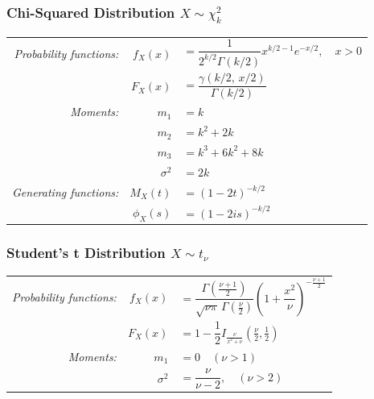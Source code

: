\documentclass[11pt,a4paper]{article}
\theoremstyle{definition}
\begin{document}
\subsubsection*{Chi-Squared Distribution $X \sim \chi^2_k$}
\begin{longtable}{r r l}
\textit{Probability functions:} & $f_X(x)$ & $=\dfrac{1}{2^{k/2}\Gamma(k/2)}x^{k/2-1}e^{-x/2}, \quad x>0$ \vspace{0.3cm}\\
& $F_X(x)$ & $=\dfrac{\gamma(k/2,\,x/2)}{\Gamma(k/2)}$ \\
\textit{Moments:} & $m_1$ & $=k$\\
& $m_2$ & $=k^2+2k$\\
& $m_3$ & $=k^3+6k^2+8k$\\
& $\sigma^2$ & $=2k$\\
\textit{Generating functions:} & $M_X(t)$ & $=(1-2t)^{-k/2}$\\
& $\phi_X(s)$ & $=(1-2is)^{-k/2}$\\
\end{longtable}

\subsubsection*{Student's t Distribution $X \sim t_\nu$}
\begin{longtable}{r r l}
\textit{Probability functions:} & $f_X(x)$ & $=\dfrac{\Gamma\!\left(\frac{\nu+1}{2}\right)}{\sqrt{\nu\pi}\,\Gamma\!\left(\frac{\nu}{2}\right)}\!\left(1+\dfrac{x^2}{\nu}\right)^{-\frac{\nu+1}{2}}$ \vspace{0.2cm} \\
& $F_X(x)$ & $=1-\dfrac{1}{2}I_{\frac{\nu}{x^2+\nu}}\!\left(\frac{\nu}{2},\frac{1}{2}\right)$\\
\textit{Moments:} & $m_1$ & $=0 \quad (\nu>1)$\\
& $\sigma^2$ & $=\dfrac{\nu}{\nu-2}, \quad (\nu>2)$\\
\end{longtable}

\end{document}
